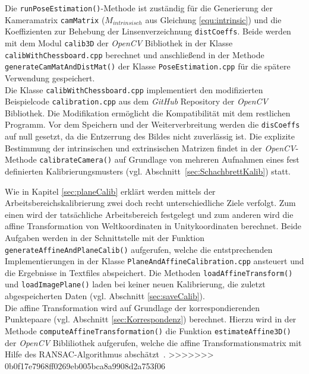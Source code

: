 Die \texttt{runPoseEstimation()}-Methode ist zuständig für die Generierung der Kameramatrix \texttt{camMatrix}  ($M_{intrinsisch}$ aus Gleichung \ref{equ:intrinsic})  und die Koeffizienten zur Behebung der Linsenverzeichnung \texttt{distCoeffs}. Beide werden mit dem Modul \texttt{calib3D} der \textit{OpenCV} Bibliothek in der Klasse \texttt{calib\-With\-Chess\-board.cpp} berechnet und anschließend in der Methode \texttt{generate\-Cam\-Mat\-And\-Dist\-Mat()} der Klasse \texttt{Pose\-Esti\-mation.cpp} für die spätere  Verwendung gespeichert. \\
Die Klasse \texttt{calib\-With\-Chess\-board.cpp} implementiert den modifizierten Beispielcode \texttt{calibration.cpp} \cite{website:calibexample} aus dem \textit{GitHub} Repository der \textit{OpenCV} Bibliothek. Die Modifikation ermöglicht die Kompatibilität mit dem restlichen Programm. Vor dem Speichern und der Weiterverbreitung werden die \texttt{disCoeffs} auf null gesetzt, da die Entzerrung des Bildes nicht zuverlässig ist. Die explizite Bestimmung der intrinsischen und extrinsischen Matrizen findet in der \textit{OpenCV}-Methode \texttt{calibrate\-Camera()} auf Grundlage von mehreren Aufnahmen eines fest definierten Kalibrierungsmusters (vgl. Abschnitt~\ref{sec:SchachbrettKalib}) statt.

Wie in Kapitel \ref{sec:planeCalib} erklärt werden mittels der Arbeitsbereichskalibrierung zwei doch recht unterschiedliche Ziele verfolgt. Zum einen wird der tatsächliche Arbeitsbereich festgelegt und zum anderen wird die affine Transformation von Weltkoordinaten in Unitykoordinaten berechnet. Beide Aufgaben werden in der Schnittstelle mit der Funktion \texttt{generate\-Affine\-And\-Plane\-Calib()} aufgerufen, welche die entstprechenden Implementierungen in der Klasse \texttt{PlaneAndAffineCalibration.cpp} ansteuert und die Ergebnisse in Textfiles abspeichert. Die Methoden \texttt{load\-Affine\-Transform()} und \texttt{load\-Image\-Plane()} laden bei keiner neuen Kalibrierung, die zuletzt abgespeicherten Daten (vgl. Abschnitt \ref{sec:saveCalib}). \\

Die affine Transformation wird auf Grundlage der korrespondierenden Punktepaare (vgl. Abschnitt \ref{sec:Korrespondenz}) berechnet. Hierzu wird in der Methode \texttt{compute\-Affine\-Trans\-formation()} die Funktion \texttt{estimate\-Affine\-3D()} der \textit{OpenCV} Bibliliothek aufgerufen, welche die affine Transformationsmatrix mit Hilfe des RANSAC-Algorithmus abschätzt~\cite{articel:RANSAC}.
>>>>>>> 0b0f17e7968ff0269eb005bca8a9908d2a753f06

